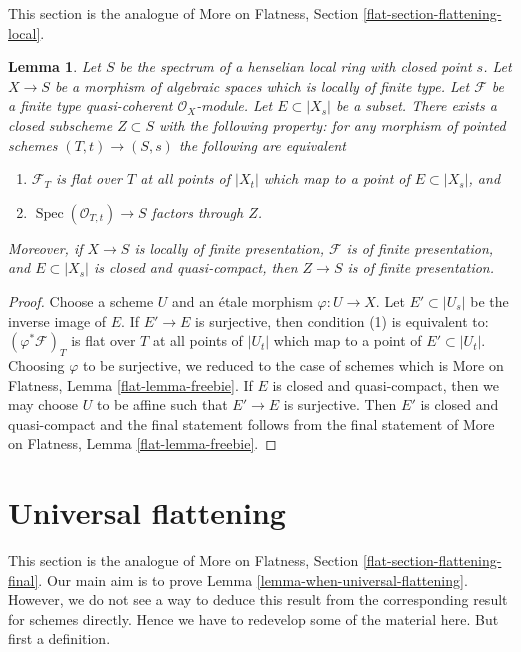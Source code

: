 \documentclass{stacks-project}
\theoremstyle{plain}
\newtheorem{lemma}[subsection]{Lemma}
\theoremstyle{definition}
\theoremstyle{remark}
\numberwithin{equation}{subsection}
\def\Spec{\mathop{\mathrm{Spec}}}
\begin{document}
\noindent
This section is the analogue of More on Flatness, Section
\ref{flat-section-flattening-local}.

\begin{lemma}
\label{lemma-freebie}
Let $S$ be the spectrum of a henselian local ring with closed point $s$.
Let $X \to S$ be a morphism of algebraic spaces which is
locally of finite type.
Let $\mathcal{F}$ be a finite type quasi-coherent $\mathcal{O}_X$-module.
Let $E \subset |X_s|$ be a subset. There exists a closed subscheme
$Z \subset S$ with the following property: for any morphism of pointed
schemes $(T, t) \to (S, s)$ the following are equivalent
\begin{enumerate}
\item $\mathcal{F}_T$ is flat over $T$ at all points of
$|X_t|$ which map to a point of $E \subset |X_s|$, and
\item $\Spec(\mathcal{O}_{T, t}) \to S$ factors through $Z$.
\end{enumerate}
Moreover, if $X \to S$ is locally of finite presentation,
$\mathcal{F}$ is of finite presentation, and $E \subset |X_s|$ is
closed and quasi-compact, then $Z \to S$ is of finite presentation.
\end{lemma}

\begin{proof}
Choose a scheme $U$ and an \'etale morphism $\varphi : U \to X$.
Let $E' \subset |U_s|$ be the inverse image of $E$. If
$E' \to E$ is surjective, then condition (1) is equivalent to:
$(\varphi^*\mathcal{F})_T$ is flat over $T$ at all points of
$|U_t|$ which map to a point of $E' \subset |U_t|$.
Choosing $\varphi$ to be surjective, we reduced to the case of schemes which is
More on Flatness, Lemma \ref{flat-lemma-freebie}.
If $E$ is closed and quasi-compact, then we may choose $U$ to be
affine such that $E' \to E$ is surjective. Then $E'$ is closed
and quasi-compact and the final statement follows from the
final statement of
More on Flatness, Lemma \ref{flat-lemma-freebie}.
\end{proof}









\section{Universal flattening}
\label{section-flattening-final}

\noindent
This section is the analogue of
More on Flatness, Section \ref{flat-section-flattening-final}.
Our main aim is to prove
Lemma \ref{lemma-when-universal-flattening}.
However, we do not see a way to deduce this result
from the corresponding result for schemes directly.
Hence we have to redevelop some of the material here.
But first a definition.
\end{document}
